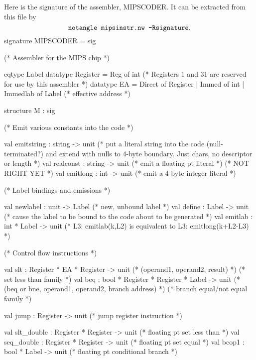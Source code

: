 \enddocs
{}
Here is the signature of the assembler, \code{}MIPSCODER\edoc{}.
It can be extracted from this file by
$$\hbox{\tt notangle mipsinstr.nw -Rsignature}.$$
\enddocs
{}
\endmoddef
signature MIPSCODER = sig

(* Assembler for the MIPS chip *)

eqtype Label
datatype Register = Reg of int
    (* Registers 1 and 31 are reserved for use by this assembler *)
datatype EA = Direct of Register | Immed of int | Immedlab of Label
                                (* effective address *)

structure M : sig

    (* Emit various constants into the code *)

    val emitstring : string -> unit     (* put a literal string into the
                                           code (null-terminated?) and
                                           extend with nulls to 4-byte 
                                           boundary. Just chars, no 
                                           descriptor or length *)
    val realconst : string -> unit      (* emit a floating pt literal *)
                                                (* NOT RIGHT YET *)
    val emitlong : int -> unit          (* emit a 4-byte integer literal *)


    (* Label bindings and emissions *)

    val newlabel : unit -> Label        (* new, unbound label *)
    val define : Label -> unit          (* cause the label to be bound to
                                           the code about to be generated *)
    val emitlab : int * Label -> unit   (* L3: emitlab(k,L2) is equivalent to
                                           L3: emitlong(k+L2-L3) *)

    (* Control flow instructions *)

    val slt : Register * EA * Register -> unit
                (* (operand1, operand2, result) *)
                                        (* set less than family *)
    val beq : bool * Register * Register * Label -> unit
                (* (beq or bne, operand1, operand2, branch address) *)
                                        (* branch equal/not equal family *)
    
    val jump : Register -> unit         (* jump register instruction *)

    val slt_double : Register * Register -> unit
                                        (* floating pt set less than *)
    val seq_double : Register * Register -> unit
                                        (* floating pt set equal *)
    val bcop1 : bool * Label -> unit    (* floating pt conditional branch *)


